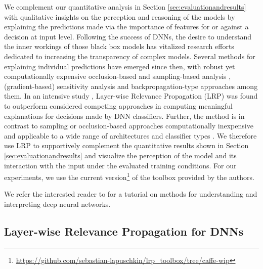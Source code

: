 \documentclass[10pt,twocolumn,letterpaper]{article}
\begin{document}
We complement our quantitative analysis
in Section \ref{sec:evaluationandresults} with qualitative insights on the perception and reasoning of the models
by explaining the predictions made via the importance of features for or against a decision at input level. Following the success of DNNs, the desire to understand the inner workings of those black box models has vitalized research efforts dedicated to increasing the transparency of complex models. Several methods for explaining individual  predictions have emerged since then, with robust yet computationally expensive occlusion-based \cite{zeiler2014visualizing} and sampling-based analysis \cite{ribeiro2016should, zintgraf2016new}, (gradient-based) sensitivity analysis \cite{gevrey2003review,baehrens2010explain,simonyan2013deep} and backpropagation-type approaches \cite{bach2015pixel,zeiler2014visualizing,MonPR17} among them.
In an intensive study \cite{samek2016evaluating}, Layer-wise Relevance Propagation (LRP) was found to outperform considered competing approaches in computing meaningful explanations for decisions made by DNN classifiers. Further, the method is in contrast to sampling or occlusion-based approaches computationally inexpensive and applicable to a wide range of architectures and classifier types \cite{bach2015pixel,lapuschkin2016analyzing}.
We therefore use LRP to supportively complement the quantitative results shown in Section \ref{sec:evaluationandresults} and visualize the perception of the model and its interaction with the input under the evaluated training conditions. For our experiments, we use the current version\footnote{\url{https://github.com/sebastian-lapuschkin/lrp_toolbox/tree/caffe-wip}} of the toolbox \cite{lapuschkin2016lrp} provided by the authors.

We refer the interested reader to \cite{MonArXiv17} for a tutorial on methods for understanding and interpreting deep neural networks.


\subsection{Layer-wise Relevance Propagation for DNNs}
\label{sec:lrp}
\end{document}
